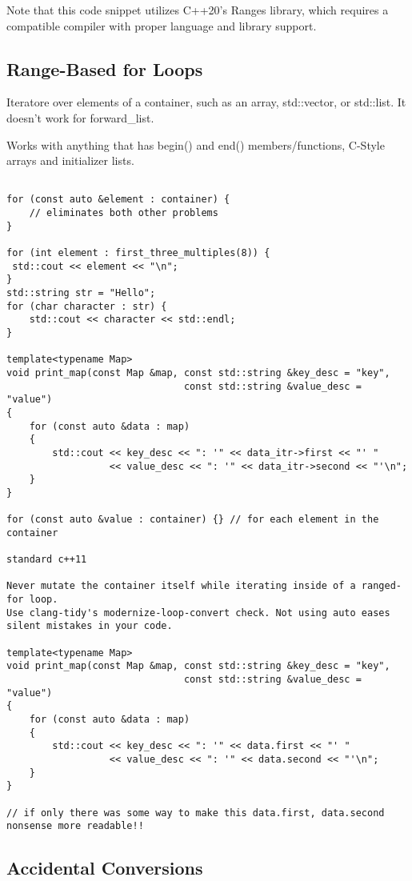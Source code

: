 Note that this code snippet utilizes C++20's Ranges library, which requires a compatible compiler with proper language and library support.

\subsection{Range-Based for Loops}


Iteratore over elements of a container, such as an array, std::vector, or std::list. It doesn't work for forward\_list.


Works with anything that has begin()
and end() members/functions, C-Style arrays and initializer lists.

\begin{verbatim}

for (const auto &element : container) {
    // eliminates both other problems
}

for (int element : first_three_multiples(8)) {
 std::cout << element << "\n";
}
std::string str = "Hello";
for (char character : str) {
    std::cout << character << std::endl;
}

template<typename Map>
void print_map(const Map &map, const std::string &key_desc = "key",
                               const std::string &value_desc = "value")
{
    for (const auto &data : map)
    {
        std::cout << key_desc << ": '" << data_itr->first << "' "
                  << value_desc << ": '" << data_itr->second << "'\n";
    }
}

for (const auto &value : container) {} // for each element in the container

standard c++11

Never mutate the container itself while iterating inside of a ranged-for loop. 
Use clang-tidy's modernize-loop-convert check. Not using auto eases silent mistakes in your code.

template<typename Map>
void print_map(const Map &map, const std::string &key_desc = "key",
                               const std::string &value_desc = "value")
{
    for (const auto &data : map)
    {
        std::cout << key_desc << ": '" << data.first << "' "
                  << value_desc << ": '" << data.second << "'\n";
    }
}

// if only there was some way to make this data.first, data.second nonsense more readable!!
\end{verbatim}

\subsection{Accidental Conversions}

